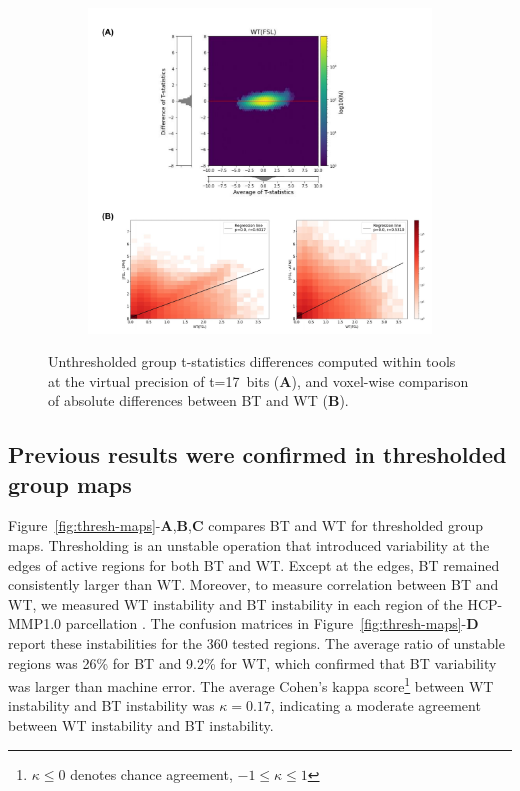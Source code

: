 \documentclass[11pt,onecolumn]{article}
\begin{document}
\begin{figure}[ht]
  \begin{subfigure}[ht]{\textwidth}
    \centering
    \includegraphics[width=.55\textwidth]{figures/p17-diffs.pdf}
  \end{subfigure}
  \caption{Unthresholded group t-statistics differences computed
  within tools at the virtual precision of t=17~bits (\textbf{A}),
  and voxel-wise comparison of absolute differences between BT and WT (\textbf{B}).}
  \label{fig:gnp-mni}
\end{figure}


\subsection{Previous results were confirmed in thresholded group maps}

Figure~\ref{fig:thresh-maps}-\textbf{A},\textbf{B},\textbf{C} compares BT
and WT for thresholded group maps. Thresholding is an unstable operation
that introduced variability at the edges of
active regions for both BT and WT. Except at the edges, BT remained consistently larger
than WT.
 Moreover, to measure correlation between BT and WT, we
measured WT instability and BT instability in each region of the
HCP-MMP1.0 parcellation . The confusion matrices in
Figure~\ref{fig:thresh-maps}-\textbf{D} report these instabilities for
the 360 tested regions. The average ratio of unstable regions was 26\%
for BT and 9.2\% for WT, which confirmed that BT variability was larger than machine error.
The average Cohen's kappa score\footnote{$\kappa \leq 0$ denotes chance agreement, $-1 \leq \kappa \leq 1$}
between WT instability and BT instability was $\kappa=0.17$, indicating
a moderate agreement between WT instability and BT instability.
\end{document}
